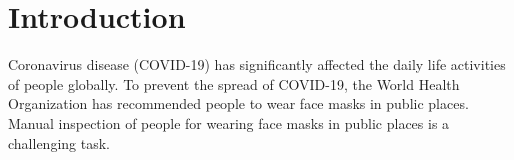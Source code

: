 \section{Introduction} 
Coronavirus disease (COVID-19) has significantly affected the daily life activities of people globally.
To prevent the spread of COVID-19, the World Health Organization has recommended people to wear face masks in public places.
Manual inspection of people for wearing face masks in public places is a challenging task.